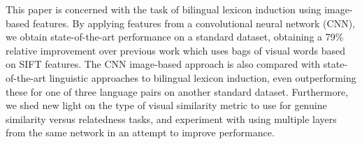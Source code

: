 This paper is concerned with the task of bilingual lexicon induction using image-based features. By applying features from a convolutional neural network (CNN), we obtain state-of-the-art performance on a standard dataset, obtaining a 79\% relative improvement over previous work which uses bags of visual words based on SIFT features. The CNN image-based approach is also compared with state-of-the-art linguistic approaches to bilingual lexicon induction, even outperforming these for one of three language pairs on another standard dataset. Furthermore, we shed new light on the type of visual similarity metric to use for genuine similarity versus relatedness tasks, and experiment with using multiple layers from the same network in an attempt to improve performance.
